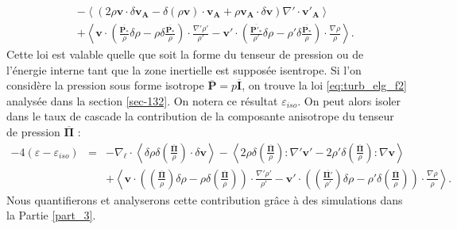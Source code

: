 \begin{equation}
{\begin{array}{lcl}
 &&- \left<\left(2\rho \boldsymbol{v} \cdot \delta \boldsymbol{v_A} - \delta \left(\rho \boldsymbol{v}\right) \cdot \boldsymbol{v_A} +  \rho \boldsymbol{v_A} \cdot \delta \boldsymbol{v} \right)\nabla' \cdot \boldsymbol{v'_A}\right> \\
&& +  \left< \boldsymbol{v} \cdot \left(  \frac{ \overline{\boldsymbol{P_*}} }{\rho} \delta \rho - \rho \delta \frac{ \overline{\boldsymbol{P_*}} }{\rho}  \right)\cdot  \frac{\nabla' \rho'}{\rho'} - \boldsymbol{v'} \cdot \left(  \frac{ \overline{\boldsymbol{P'_*}} }{\rho'} \delta \rho - \rho' \delta \frac{ \overline{\boldsymbol{P_*}} }{\rho}  \right)\cdot  \frac{\nabla \rho}{\rho}  \right>.
\end{array}}
\end{equation}
Cette loi est valable quelle que soit la forme du tenseur de pression ou de l'énergie interne tant que la zone inertielle est supposée isentrope. Si l'on considère la pression sous forme isotrope $\overline{\boldsymbol{P}} = p \overline{\boldsymbol{I}}$, on trouve la loi \eqref{eq:turb_elg_f2} analysée dans la section \ref{sec-132}. On notera ce résultat $\varepsilon_{iso}$. On peut alors isoler dans le taux de cascade la contribution de la composante anisotrope du tenseur de pression $\overline{\boldsymbol{\Pi}}$ : 
\begin{equation}
\label{eq:turb_cpgyr_an} \boxed{
\begin{array}{lcl}
- 4\left(\varepsilon - \varepsilon_{iso}\right) &=& - \nabla_{\boldsymbol{\ell}} \cdot \left< \delta \rho \delta \left(\frac{\overline{\boldsymbol{\Pi}}}{\rho}\right) \cdot \delta \boldsymbol{v} \right>  -\left< 2\rho \delta \left(\frac{\overline{\boldsymbol{\Pi}}}{\rho}\right):\nabla' \boldsymbol{v'} -  2\rho' \delta \left(\frac{\overline{\boldsymbol{\Pi}}}{\rho}\right) :\nabla  \boldsymbol{v}\right>\\
&& +  \left< \boldsymbol{v} \cdot \left(  \left(\frac{\overline{\boldsymbol{\Pi}}}{\rho}\right) \delta \rho - \rho \delta \left(\frac{\overline{\boldsymbol{\Pi}}}{\rho}\right)  \right)\cdot  \frac{\nabla' \rho'}{\rho'}-\boldsymbol{v'} \cdot \left(  \left(\frac{\overline{\boldsymbol{\Pi'}}}{\rho'}\right) \delta \rho - \rho' \delta \left(\frac{\overline{\boldsymbol{\Pi}}}{\rho}\right)  \right)\cdot  \frac{\nabla \rho}{\rho}  \right>.
\end{array}}
\end{equation}
Nous quantifierons et analyserons cette contribution grâce à des simulations dans la Partie \ref{part_3}. 

